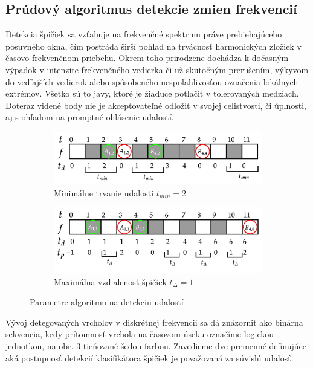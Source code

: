 \subsection{Prúdový algoritmus detekcie zmien frekvencií}
Detekcia špičiek sa vzťahuje na frekvenčné spektrum práve prebiehajúceho posuvného okna, čím postráda širší pohľad na trvácnosť
harmonických zložiek v časovo-frekvenčnom priebehu. Okrem toho prirodzene dochádza k dočasným výpadok v intenzite frekvenčného
vedierka či už skutočným prerušením, výkyvom do vedľajších vedierok alebo spôsobeného nespoľahlivosťou označenia lokálnych extrémov.
Všetko sú to javy, ktoré je žiaduce potlačiť v tolerovaných medziach. Doteraz videné body nie je akceptovateľné odložiť v svojej
celistvosti, či úplnosti, aj s ohľadom na promptné ohlásenie udalostí.
\begin{figure}[h!]
\centering
\begin{subfigure}[b]{0.8\textwidth}
    \centering
    \includegraphics[width=\textwidth]{figures/design/event-detection-min-duration.png}
    \caption{Minimálne trvanie udalosti $t_{min} = 2$}
    \label{event-detector:tmin}
\end{subfigure}
\begin{subfigure}[b]{0.8\textwidth}
    \centering
    \includegraphics[width=\textwidth]{figures/design/event-detection-time-proximity.png}
    \caption{Maximálna vzdialenosť špičiek $t_{\Delta} = 1$}
     \label{event-detector:tdelta}
\end{subfigure}
\caption{Parametre algoritmu na detekciu udalostí}
\label{event-detector}
\end{figure}

Vývoj detegovaných vrcholov v diskrétnej frekvencii sa dá znázorniť ako binárna sekvencia, kedy prítomnosť vrchola na časovom úseku
označíme logickou jednotkou, na obr. \ref{event-detector} tieňované šedou farbou. Zavedieme dve premenné definujúce aká postupnosť
detekcií klasifikátora špičiek je považovaná za súvislú udalosť.

